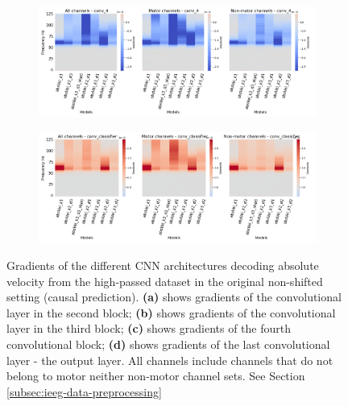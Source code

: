 \begin{figure}[!htbp]\ContinuedFloat

\begin{subfigure}[c]{\textwidth}
   \includegraphics[width=0.9\linewidth]{img/appendix/A/conv-4/hp-m/absVel-model_gradients_all_kinds}
   \caption{}
   \label{fig:absVel-hp-grads-conv-4}
\end{subfigure}


\begin{subfigure}[d]{\textwidth}
   \includegraphics[width=0.9\linewidth]{img/appendix/A/conv-classifier/hp-m/absVel-model_gradients_all_kinds}
   \caption{}
   \label{fig:absVel-hp-grads-conv-classifier}
\end{subfigure}

\caption[]{Gradients of the different CNN architectures decoding absolute velocity from the high-passed dataset in the original non-shifted setting (causal prediction). \textbf{(a)} shows gradients of the convolutional layer in the second block; \textbf{(b)} shows gradients of the convolutional layer in the third block; \textbf{(c)} shows gradients of the fourth convolutional block; \textbf{(d)} shows gradients of the last convolutional layer - the output layer. All channels include channels that do not belong to motor neither non-motor channel sets. See Section \ref{subsec:ieeg-data-preprocessing}}
\label{fig:absVel-hp-grads}
\end{figure}